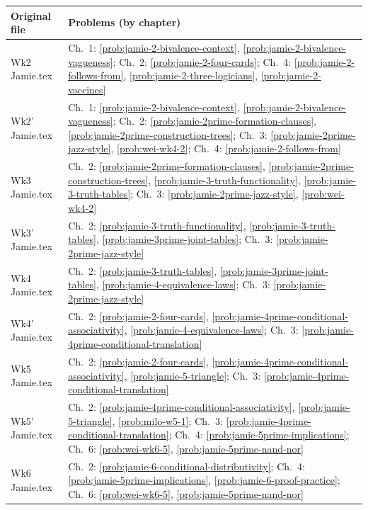 \documentclass[11pt,letterpaper,oneside,openany]{book}
\begin{document}
\small\begin{longtable}{@{}p{}p{}@{}}
\toprule Original file & Problems (by chapter) \\ \midrule\endhead
Wk2 Jamie.tex & Ch.~1: \ref{prob:jamie-2-bivalence-context}, \ref{prob:jamie-2-bivalence-vagueness}; Ch.~2: \ref{prob:jamie-2-four-cards}; Ch.~4: \ref{prob:jamie-2-follows-from}, \ref{prob:jamie-2-three-logicians}, \ref{prob:jamie-2-vaccines} \\
Wk2' Jamie.tex & Ch.~1: \ref{prob:jamie-2-bivalence-context}, \ref{prob:jamie-2-bivalence-vagueness}; Ch.~2: \ref{prob:jamie-2prime-formation-clauses}, \ref{prob:jamie-2prime-construction-trees}; Ch.~3: \ref{prob:jamie-2prime-jazz-style}, \ref{prob:wei-wk4-2}; Ch.~4: \ref{prob:jamie-2-follows-from} \\
Wk3 Jamie.tex & Ch.~2: \ref{prob:jamie-2prime-formation-clauses}, \ref{prob:jamie-2prime-construction-trees}, \ref{prob:jamie-3-truth-functionality}, \ref{prob:jamie-3-truth-tables}; Ch.~3: \ref{prob:jamie-2prime-jazz-style}, \ref{prob:wei-wk4-2} \\
Wk3' Jamie.tex & Ch.~2: \ref{prob:jamie-3-truth-functionality}, \ref{prob:jamie-3-truth-tables}, \ref{prob:jamie-3prime-joint-tables}; Ch.~3: \ref{prob:jamie-2prime-jazz-style} \\
Wk4 Jamie.tex & Ch.~2: \ref{prob:jamie-3-truth-tables}, \ref{prob:jamie-3prime-joint-tables}, \ref{prob:jamie-4-equivalence-laws}; Ch.~3: \ref{prob:jamie-2prime-jazz-style} \\
Wk4' Jamie.tex & Ch.~2: \ref{prob:jamie-2-four-cards}, \ref{prob:jamie-4prime-conditional-associativity}, \ref{prob:jamie-4-equivalence-laws}; Ch.~3: \ref{prob:jamie-4prime-conditional-translation} \\
Wk5 Jamie.tex & Ch.~2: \ref{prob:jamie-2-four-cards}, \ref{prob:jamie-4prime-conditional-associativity}, \ref{prob:jamie-5-triangle}; Ch.~3: \ref{prob:jamie-4prime-conditional-translation} \\
Wk5' Jamie.tex & Ch.~2: \ref{prob:jamie-4prime-conditional-associativity}, \ref{prob:jamie-5-triangle}, \ref{prob:milo-w5-1}; Ch.~3: \ref{prob:jamie-4prime-conditional-translation}; Ch.~4: \ref{prob:jamie-5prime-implications}; Ch.~6: \ref{prob:wei-wk6-5}, \ref{prob:jamie-5prime-nand-nor} \\
Wk6 Jamie.tex & Ch.~2: \ref{prob:jamie-6-conditional-distributivity}; Ch.~4: \ref{prob:jamie-5prime-implications}, \ref{prob:jamie-6-proof-practice}; Ch.~6: \ref{prob:wei-wk6-5}, \ref{prob:jamie-5prime-nand-nor} \\

\end{longtable}
\end{document}
